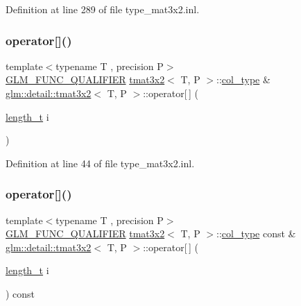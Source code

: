 Definition at line 289 of file type\+\_\+mat3x2.\+inl.

\mbox{\label{structglm_1_1detail_1_1tmat3x2_a8ffe61490e2ac7330fca4b01d4c8f6d3}} 
\subsubsection{\texorpdfstring{operator[]()}{operator[]()}\hspace{0.1cm}{\footnotesize\ttfamily [1/2]}}
{\footnotesize\ttfamily template$<$typename T , precision P$>$ \\
\hyperlink{setup_8hpp_a33fdea6f91c5f834105f7415e2a64407}{G\+L\+M\+\_\+\+F\+U\+N\+C\+\_\+\+Q\+U\+A\+L\+I\+F\+I\+ER} \hyperlink{structglm_1_1detail_1_1tmat3x2}{tmat3x2}$<$ T, P $>$\+::\hyperlink{structglm_1_1detail_1_1tmat3x2_a9c0f2cfe8e359b2917b5f616a5dbc9e4}{col\+\_\+type} \& \hyperlink{structglm_1_1detail_1_1tmat3x2}{glm\+::detail\+::tmat3x2}$<$ T, P $>$\+::operator\mbox{[}$\,$\mbox{]} (\begin{DoxyParamCaption}\item[{\hyperlink{namespaceglm_a090a0de2260835bee80e71a702492ed9}{length\+\_\+t}}]{i }\end{DoxyParamCaption})}



Definition at line 44 of file type\+\_\+mat3x2.\+inl.

\mbox{\label{structglm_1_1detail_1_1tmat3x2_a2c6aa811283dfe37045895cd15aad7c1}} 
\subsubsection{\texorpdfstring{operator[]()}{operator[]()}\hspace{0.1cm}{\footnotesize\ttfamily [2/2]}}
{\footnotesize\ttfamily template$<$typename T , precision P$>$ \\
\hyperlink{setup_8hpp_a33fdea6f91c5f834105f7415e2a64407}{G\+L\+M\+\_\+\+F\+U\+N\+C\+\_\+\+Q\+U\+A\+L\+I\+F\+I\+ER} \hyperlink{structglm_1_1detail_1_1tmat3x2}{tmat3x2}$<$ T, P $>$\+::\hyperlink{structglm_1_1detail_1_1tmat3x2_a9c0f2cfe8e359b2917b5f616a5dbc9e4}{col\+\_\+type} const  \& \hyperlink{structglm_1_1detail_1_1tmat3x2}{glm\+::detail\+::tmat3x2}$<$ T, P $>$\+::operator\mbox{[}$\,$\mbox{]} (\begin{DoxyParamCaption}\item[{\hyperlink{namespaceglm_a090a0de2260835bee80e71a702492ed9}{length\+\_\+t}}]{i }\end{DoxyParamCaption}) const}



